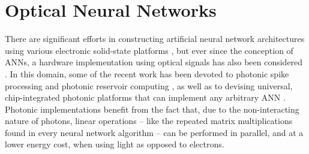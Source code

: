\section{Optical Neural Networks}



There are significant efforts in constructing artificial neural network architectures using various electronic solid-state platforms \cite{Merolla2014,Prezioso2015}, but ever since the conception of ANNs, a hardware implementation using optical signals has also been considered \cite{Abu-Mostafa1987, Jutamulia1996}. In this domain, some of the recent work has been devoted to photonic spike processing \cite{Rosenbluth2009, Tait2014} and photonic reservoir computing \cite{Brunner2013, Vandoorne2014}, as well as to devising universal, chip-integrated photonic platforms that can implement any arbitrary ANN \cite{Shainline2017, shen2017deep}.  Photonic implementations benefit from the fact that, due to the non-interacting nature of photons, linear operations -- like the repeated matrix multiplications found in every neural network algorithm -- can be performed in parallel, and at a lower energy cost, when using light as opposed to electrons. 

